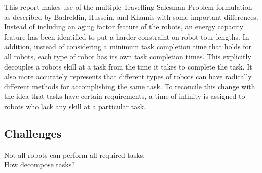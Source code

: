 \documentclass[a4paper]{article}
\begin{document}
This report makes use of the multiple Travelling Salesman Problem formulation as described by Badreldin, Hussein, and Khamis with some important differences. \cite{Badreldin} Instead of including an aging factor feature of the robots, an energy capacity feature has been identified to put a harder constraint on robot tour lengths. In addition, instead of considering a minimum task completion time that holds for all robots, each type of robot has its own task completion times. This explicitly decouples a robots skill at a task from the time it takes to complete the task. It also more accurately represents that different types of robots can have radically different methods for accomplishing the same task. To reconcile this change with the idea that tasks have certain requirements, a time of infinity is assigned to robots who lack any skill at a particular task.

\subsection{Challenges}
Not all robots can perform all required tasks.\\
How decompose tasks?\\





%
\end{document}
